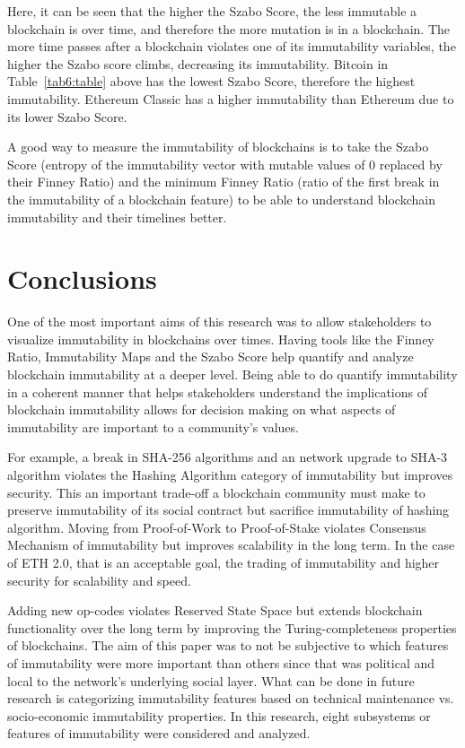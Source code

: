 \documentclass{article}
\begin{document}
Here, it can be seen that the higher the Szabo Score, the less immutable a blockchain is over time, and therefore the more mutation is in a blockchain. The more time passes after a blockchain violates one of its immutability variables, the higher the Szabo score climbs, decreasing its immutability. Bitcoin in Table~\ref{tab6:table} above has the lowest Szabo Score, therefore the highest immutability. Ethereum Classic has a higher immutability than Ethereum due to its lower Szabo Score. 

A good way to measure the immutability of blockchains is to take the Szabo Score (entropy of the immutability vector with mutable values of 0 replaced by their Finney Ratio) and the minimum Finney Ratio (ratio of the first break in the immutability of a blockchain feature) to be able to understand blockchain immutability and their timelines better.

\section{Conclusions}

One of the most important aims of this research was to allow stakeholders to visualize immutability in blockchains over times. Having tools like the Finney Ratio, Immutability Maps and the Szabo Score help quantify and analyze blockchain immutability at a deeper level. Being able to do quantify immutability in a coherent manner that helps stakeholders understand the implications of blockchain immutability allows for decision making on what aspects of immutability are important to a community’s values.

For example, a break in SHA-256 algorithms and an network upgrade to SHA-3 algorithm violates the Hashing Algorithm category of immutability but improves security. This an important trade-off a blockchain community must make to preserve immutability of its social contract but sacrifice immutability of hashing algorithm. Moving from Proof-of-Work to Proof-of-Stake violates Consensus Mechanism of immutability but improves scalability in the long term. In the case of ETH 2.0, that is an acceptable goal, the trading of immutability and higher security for scalability and speed. 

Adding new op-codes violates Reserved State Space but extends blockchain functionality over the long term by improving the Turing-completeness properties of blockchains. The aim of this paper was to not be subjective to which features of immutability were more important than others since that was political and local to the network's underlying social layer. What can be done in future research is categorizing immutability features based on technical maintenance vs. socio-economic immutability properties. In this research, eight subsystems or features of immutability were considered and analyzed. 
\end{document}
